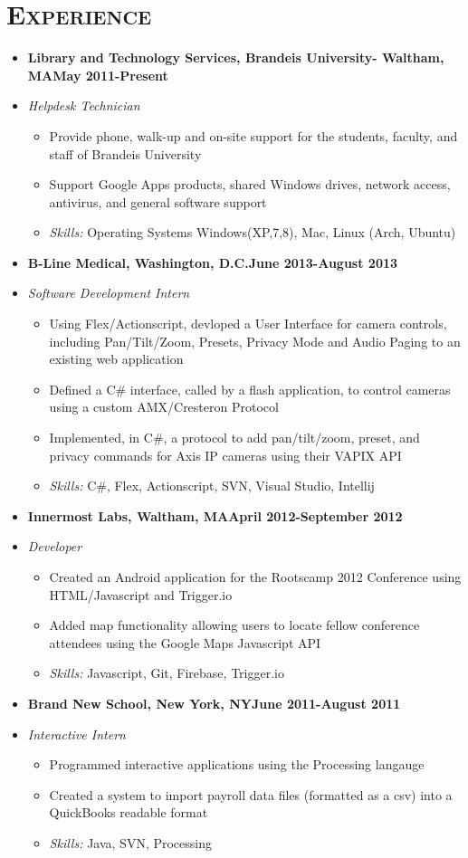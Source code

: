 \documentclass[10pt, oneside]{article}
\newcommand{\lr}[2]{#1\hfill#2}
\newcommand{\skills}[1]{
\item[] \textsl{Skills:} #1
}
\newenvironment{ressection}[1]{
  \section{\normalsize \scshape \selectfont #1 \normalfont}
  \vspace{-4pt}
  \begin{itemize} \itemsep-2pt
  }{
  \end{itemize}
  \vspace{-20pt}
}
\newenvironment{resitem}[4]{
\item[] \lr{\bfseries \selectfont #1\normalfont, #2} {#3}
\item[] \textsl{#4}
  \vspace{-4pt}
  \begin{itemize} \itemsep-2pt
  }{
  \end{itemize}
}
\begin{document}
\begin{ressection}{Experience}
  \begin{resitem}{Library and Technology Services}{Brandeis University- Waltham, MA}{May 2011-Present}{Helpdesk Technician} 
  \item Provide phone, walk-up and on-site support for the students, faculty, and staff of Brandeis University
  \item Support Google Apps products, shared Windows drives, network access, antivirus, and general software support 
    \skills{Operating Systems Windows(XP,7,8), Mac, Linux (Arch, Ubuntu)}
  \end{resitem}
  
  \begin{resitem}{B-Line Medical}{Washington, D.C.}{June 2013-August 2013}{Software Development Intern}
  \item Using Flex/Actionscript, devloped a User Interface for camera controls, including Pan/Tilt/Zoom, Presets, Privacy Mode and Audio Paging to an existing web application
  \item Defined a C\# interface, called by a flash application, to control cameras using a custom AMX/Cresteron Protocol
  \item Implemented, in C\#, a protocol to add pan/tilt/zoom, preset, and privacy commands for Axis IP cameras using their VAPIX API
    \skills{C\#, Flex, Actionscript, SVN, Visual Studio, Intellij}
  \end{resitem}
  \begin{resitem}{Innermost Labs}{Waltham, MA}{April 2012-September 2012}{Developer}
  \item Created an Android application for the Rootscamp 2012 Conference using HTML/Javascript and Trigger.io
  \item Added map functionality allowing users to locate fellow conference attendees  using the Google Maps Javascript API
    \skills{Javascript, Git, Firebase, Trigger.io}
  \end{resitem}
  \begin{resitem}{Brand New School}{New York, NY}{June 2011-August 2011}{Interactive Intern}
  \item Programmed interactive applications using the Processing langauge
  \item Created a system to import payroll data files (formatted as a csv) into a QuickBooks readable format
    \skills{Java, SVN, Processing}
  \end{resitem}
\end{ressection}
\end{document}
